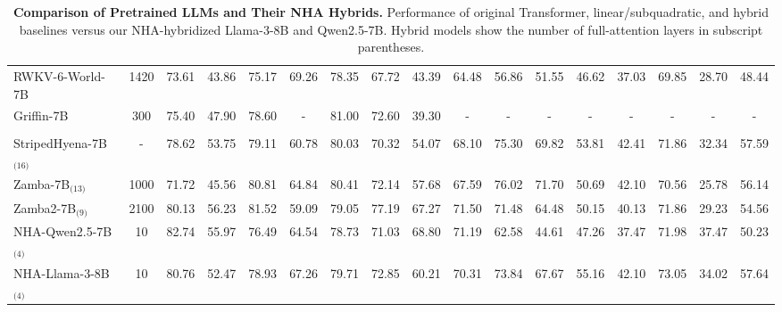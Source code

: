 \begin{table}[h!]
\begin{adjustbox}{width=1.05\textwidth, center}
\begin{small}
\begin{tabular}{lc|ccccccc>{\columncolor{red!7}}c|cccccc>{\columncolor{red!7}}c}
        RWKV-6-World-7B & 1420 & 73.61 & 43.86 & 75.17 & 69.26 & 78.35 & 67.72 & 43.39 & 64.48 & 56.86 & 51.55 & 46.62 & 37.03 & 69.85 & 28.70 & 48.44 \\
        Griffin-7B & 300 & 75.40 & 47.90 & 78.60 & - & 81.00 & 72.60 & 39.30 & - & - & - & - & - & - & - & - \\
        \midrule
        \rowcolor{gray!15}\multicolumn{17}{l}{\textbf{\textit{Hybrid}}} \\
        StripedHyena-7B$_{\text{(16)}}$ & - & 78.62 & 53.75 & 79.11 & 60.78 & 80.03 & 70.32 & 54.07 & 68.10 & 75.30 & 69.82 & 53.81 & 42.41 & 71.86 & 32.34 & 57.59 \\
        Zamba-7B$_{\text{(13)}}$ & 1000 & 71.72 & 45.56 & 80.81 & 64.84 & 80.41 & 72.14 & 57.68 & 67.59 & 76.02 & 71.70 & 50.69 & 42.10 & 70.56 & 25.78 & 56.14 \\
        Zamba2-7B$_{\text{(9)}}$ & 2100 & 80.13 & 56.23 & 81.52 & 59.09 & 79.05 & 77.19 & 67.27 & 71.50 & 71.48 & 64.48 & 50.15 & 40.13 & 71.86 & 29.23 & 54.56 \\
        \midrule
        \rowcolor{blue!7} NHA-Qwen2.5-7B$_{\text{(4)}}$ & 10 & 82.74 & 55.97 & 76.49 & 64.54 & 78.73 & 71.03 & 68.80 & 71.19 & 62.58 & 44.61 & 47.26 & 37.47 & 71.98 & 37.47 & 50.23 \\
        \rowcolor{yellow!7} NHA-Llama-3-8B$_{\text{(4)}}$ & 10 & 80.76 & 52.47 & 78.93 & 67.26 & 79.71 & 72.85 & 60.21 & 70.31 & 73.84 & 67.67 & 55.16 & 42.10 & 73.05 & 34.02 & 57.64 \\
        \bottomrule
    \end{tabular}
    \label{tab:main_results}
    \end{small}
    \end{adjustbox}
    \vspace{-0.5em}
    \caption{\textbf{Comparison of Pretrained LLMs and Their NHA Hybrids.} Performance of original Transformer, linear/subquadratic, and hybrid baselines versus our NHA-hybridized Llama-3-8B and Qwen2.5-7B. Hybrid models show the number of full-attention layers in subscript parentheses.}
    \label{table:finetune}
\end{table}
